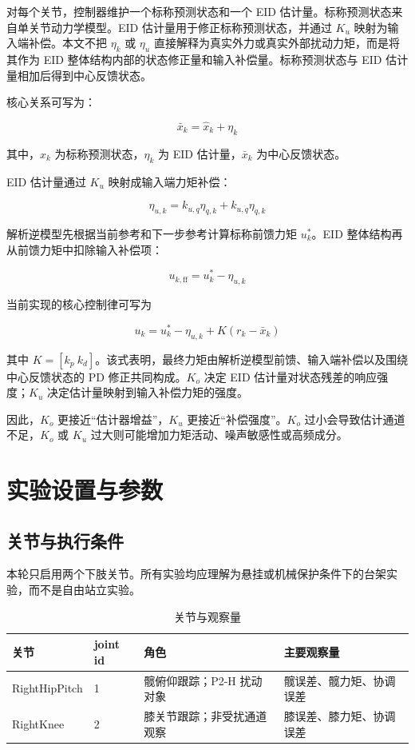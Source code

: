 \documentclass[12pt,a4paper]{ctexart}
\begin{document}
对每个关节，控制器维护一个标称预测状态和一个 EID 估计量。标称预测状态来自单关节动力学模型。EID 估计量用于修正标称预测状态，并通过 $K_u$ 映射为输入端补偿。本文不把 $\eta_k$ 或 $\eta_u$ 直接解释为真实外力或真实外部扰动力矩，而是将其作为 EID 整体结构内部的状态修正量和输入补偿量。标称预测状态与 EID 估计量相加后得到中心反馈状态。

核心关系可写为：

\[
\bar{x}_k=\hat{x}_k+\eta_k
\]

其中，$\hat{x}_k$ 为标称预测状态，$\eta_k$ 为 EID 估计量，$\bar{x}_k$ 为中心反馈状态。

EID 估计量通过 $K_u$ 映射成输入端力矩补偿：

\[
\eta_{u,k}=k_{u,q}\eta_{q,k}+k_{u,\dot q}\eta_{\dot q,k}
\]

解析逆模型先根据当前参考和下一步参考计算标称前馈力矩 $u_k^*$。EID 整体结构再从前馈力矩中扣除输入补偿项：

\[
u_{k,\mathrm{ff}}=u_k^*-\eta_{u,k}
\]

当前实现的核心控制律可写为

\[
u_k
=
u_k^*
-\eta_{u,k}
+K(r_k-\bar{x}_k)
\]

其中 $K=[k_p\ k_d]$。该式表明，最终力矩由解析逆模型前馈、输入端补偿以及围绕中心反馈状态的 PD 修正共同构成。$K_o$ 决定 EID 估计量对状态残差的响应强度；$K_u$ 决定估计量映射到输入补偿力矩的强度。

因此，$K_o$ 更接近“估计器增益”，$K_u$ 更接近“补偿强度”。$K_o$ 过小会导致估计通道不足，$K_o$ 或 $K_u$ 过大则可能增加力矩活动、噪声敏感性或高频成分。

\section{实验设置与参数}


\subsection{关节与执行条件}


本轮只启用两个下肢关节。所有实验均应理解为悬挂或机械保护条件下的台架实验，而不是自由站立实验。

\begin{table}[htbp]
\centering
\footnotesize
\caption{关节与观察量}
\begin{tabularx}{\textwidth}{YYYY}
\toprule
关节 & joint id & 角色 & 主要观察量 \\
\midrule
RightHipPitch & 1 & 髋俯仰跟踪；P2-H 扰动对象 & 髋误差、髋力矩、协调误差 \\
RightKnee & 2 & 膝关节跟踪；非受扰通道观察 & 膝误差、膝力矩、协调误差 \\
\bottomrule
\end{tabularx}
\end{table}
\end{document}
